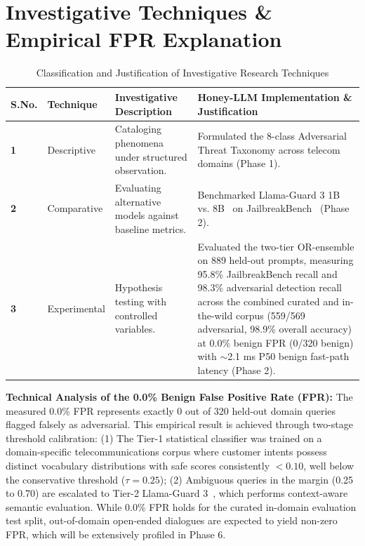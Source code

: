 \documentclass[12pt,a4paper,oneside]{report}
\begin{document}
\section{Investigative Techniques \& Empirical FPR Explanation}
\begin{table}[H]
\small
\renewcommand{\arraystretch}{1.2}
\begin{tabularx}{\textwidth}{@{}p{0.5in} p{1.0in} p{1.4in} X@{}}
\rowcolor{HeaderGray} \textbf{S.No.} & \textbf{Technique} & \textbf{Investigative Description} & \textbf{Honey-LLM Implementation \& Justification} \\
\hline
\textbf{1} & Descriptive & Cataloging phenomena under structured observation. & Formulated the 8-class Adversarial Threat Taxonomy across telecom domains (Phase 1). \\
\textbf{2} & Comparative & Evaluating alternative models against baseline metrics. & Benchmarked Llama-Guard 3 1B vs. 8B~\cite{llamaguard3} on JailbreakBench~\cite{jailbreakbench2024} (Phase 2). \\
\textbf{3} & Experimental & Hypothesis testing with controlled variables. & Evaluated the two-tier OR-ensemble on 889 held-out prompts, measuring 95.8\% JailbreakBench recall and 98.3\% adversarial detection recall across the combined curated and in-the-wild corpus (559/569 adversarial, 98.9\% overall accuracy) at 0.0\% benign FPR (0/320 benign) with $\sim$2.1 ms P50 benign fast-path latency (Phase 2). \\
\hline
\end{tabularx}
\caption{Classification and Justification of Investigative Research Techniques}
\end{table}

\noindent\textbf{Technical Analysis of the 0.0\% Benign False Positive Rate (FPR):} The measured 0.0\% FPR represents exactly 0 out of 320 held-out domain queries flagged falsely as adversarial. This empirical result is achieved through two-stage threshold calibration: (1) The Tier-1 statistical classifier was trained on a domain-specific telecommunications corpus where customer intents possess distinct vocabulary distributions with safe scores consistently $< 0.10$, well below the conservative threshold ($\tau = 0.25$); (2) Ambiguous queries in the margin (0.25 to 0.70) are escalated to Tier-2 Llama-Guard 3~\cite{llamaguard3}, which performs context-aware semantic evaluation. While 0.0\% FPR holds for the curated in-domain evaluation test split, out-of-domain open-ended dialogues are expected to yield non-zero FPR, which will be extensively profiled in Phase 6.
\end{document}
